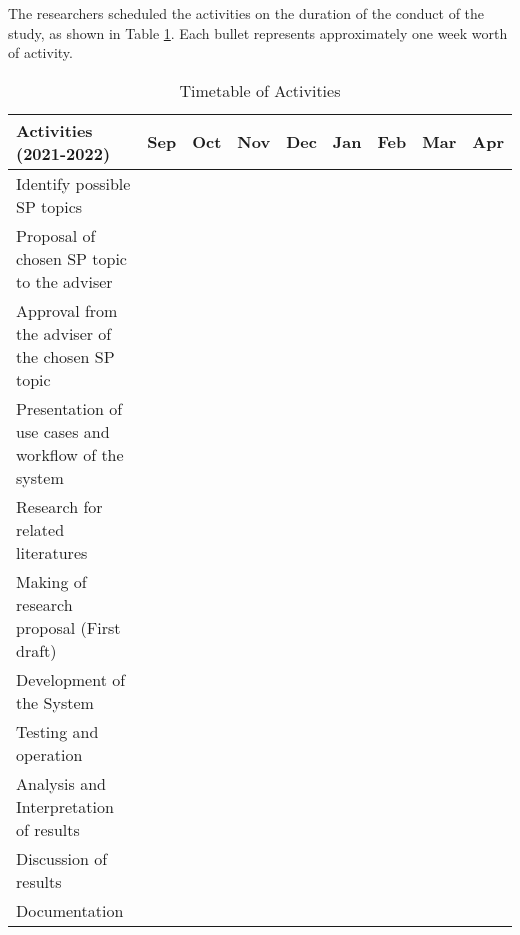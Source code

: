 The researchers scheduled the activities on the duration of the conduct of the study, as shown in Table \ref{tab:timetableactivities}. Each bullet represents approximately one week worth of activity.

%
%
\newcommand{\weekone}{\textbullet}
\newcommand{\weektwo}{\textbullet \textbullet}
\newcommand{\weekthree}{\textbullet \textbullet \textbullet}
\newcommand{\weekfour}{\textbullet \textbullet \textbullet \textbullet}

%
%
\begin{comment}
	\newcommand{\weekone}{$\star$}
	\newcommand{\weektwo}{$\star \star$}
	\newcommand{\weekthree}{$\star \star \star$}
	\newcommand{\weekfour}{$\star \star \star \star$ }
\end{comment}



\begin{table}[ht]   %
	\centering
	\caption{Timetable of Activities} \vspace{0.25em}
	\begin{tabular}{|p{1.8in}|c|c|c|c|c|c|c|c|} \hline
		\centering Activities (2021-2022) & Sep   & Oct & Nov & Dec & Jan & Feb & Mar & Apr \\ \hline
		Identify possible SP topics      &  \weekone  &  &  &  &  &  &  & \\ \hline
		Proposal of chosen SP topic to the adviser &  & \weekone &  &  &  &  &  & \\ \hline
		Approval from the adviser of the chosen SP topic       &  & \weekone &  &  &  &  &  & \\ \hline
		Presentation of use cases and workflow of the system    &   & \weekone &  &  &  &  &  & \\ \hline
		Research for related literatures  &   & \weekone & \weekfour &  &  &  &  & \\ \hline
		Making of research proposal (First draft) & \weekone  & \weekfour & \weekone  &  &  &  &  & \\ \hline
		Development of the System &  & \weekone & \weekfour & \weektwo & \weektwo & \weekfour &  & \\ \hline
		Testing and operation &  &  &  & \weektwo &  &  & \weekfour & \\ \hline
		Analysis and Interpretation of results &   &  &  &  &  & \weekfour & \weekfour & \\ \hline
		Discussion of results &  &  &  & \weekfour &  & & \weekfour & \weekfour \\ \hline
		Documentation & \weekone  & \weekfour & \weekfour & \weekfour & \weekfour & \weekfour & \weekfour & \weekfour \\ \hline
	\end{tabular}
	\label{tab:timetableactivities}
\end{table}


